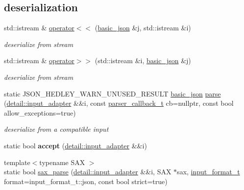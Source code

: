 \subsection*{deserialization}
\begin{DoxyCompactItemize}
\item 
std\+::istream \& \mbox{\hyperlink{classnlohmann_1_1basic__json_a60ca396028b8d9714c6e10efbf475af6}{operator$<$$<$}} (\mbox{\hyperlink{classnlohmann_1_1basic__json}{basic\+\_\+json}} \&j, std\+::istream \&i)
\begin{DoxyCompactList}\small\item\em deserialize from stream \end{DoxyCompactList}\item 
std\+::istream \& \mbox{\hyperlink{classnlohmann_1_1basic__json_aaf363408931d76472ded14017e59c9e8}{operator$>$$>$}} (std\+::istream \&i, \mbox{\hyperlink{classnlohmann_1_1basic__json}{basic\+\_\+json}} \&j)
\begin{DoxyCompactList}\small\item\em deserialize from stream \end{DoxyCompactList}\item 
static J\+S\+O\+N\+\_\+\+H\+E\+D\+L\+E\+Y\+\_\+\+W\+A\+R\+N\+\_\+\+U\+N\+U\+S\+E\+D\+\_\+\+R\+E\+S\+U\+LT \mbox{\hyperlink{classnlohmann_1_1basic__json}{basic\+\_\+json}} \mbox{\hyperlink{classnlohmann_1_1basic__json_a265a473e939184aa42655c9ccdf34e58}{parse}} (\mbox{\hyperlink{classnlohmann_1_1detail_1_1input__adapter}{detail\+::input\+\_\+adapter}} \&\&i, const \mbox{\hyperlink{classnlohmann_1_1basic__json_ab4f78c5f9fd25172eeec84482e03f5b7}{parser\+\_\+callback\+\_\+t}} cb=nullptr, const bool allow\+\_\+exceptions=true)
\begin{DoxyCompactList}\small\item\em deserialize from a compatible input \end{DoxyCompactList}\item 
\mbox{\label{classnlohmann_1_1basic__json_a875585b0cb6133902066daccd7c9d420}} 
static bool {\bfseries accept} (\mbox{\hyperlink{classnlohmann_1_1detail_1_1input__adapter}{detail\+::input\+\_\+adapter}} \&\&i)
\item 
{\footnotesize template$<$typename S\+AX $>$ }\\static bool \mbox{\hyperlink{classnlohmann_1_1basic__json_a8a3dd150c2d1f0df3502d937de0871db}{sax\+\_\+parse}} (\mbox{\hyperlink{classnlohmann_1_1detail_1_1input__adapter}{detail\+::input\+\_\+adapter}} \&\&i, S\+AX $\ast$sax, \mbox{\hyperlink{namespacenlohmann_1_1detail_aa554fc6a11519e4f347deb25a9f0db40}{input\+\_\+format\+\_\+t}} format=input\+\_\+format\+\_\+t\+::json, const bool strict=true)

\end{DoxyCompactItemize}
